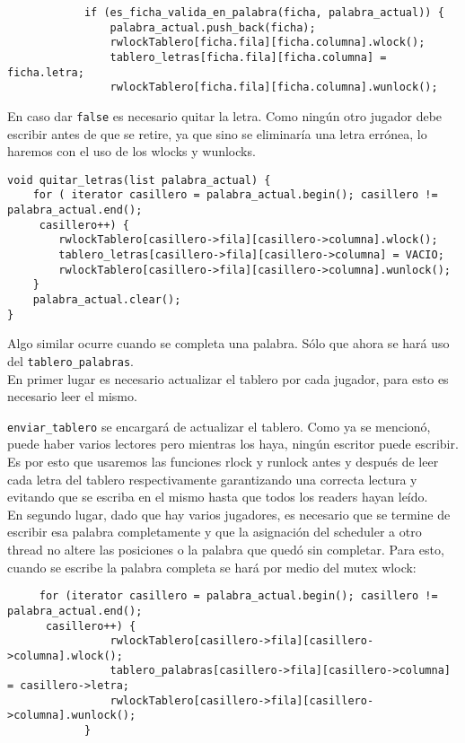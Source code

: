 \begin{verbatim}
            if (es_ficha_valida_en_palabra(ficha, palabra_actual)) {
                palabra_actual.push_back(ficha);
                rwlockTablero[ficha.fila][ficha.columna].wlock();
                tablero_letras[ficha.fila][ficha.columna] = ficha.letra;
                rwlockTablero[ficha.fila][ficha.columna].wunlock(); 
\end{verbatim}

En caso dar \texttt{false} es necesario quitar la letra. Como ningún otro jugador debe escribir antes de que se retire, ya que sino se eliminaría una letra errónea, lo haremos con el uso de los wlocks y wunlocks.

\begin{verbatim}
void quitar_letras(list palabra_actual) {
    for ( iterator casillero = palabra_actual.begin(); casillero != palabra_actual.end();
     casillero++) {
        rwlockTablero[casillero->fila][casillero->columna].wlock();
        tablero_letras[casillero->fila][casillero->columna] = VACIO;
        rwlockTablero[casillero->fila][casillero->columna].wunlock();
    }
    palabra_actual.clear();
}
\end{verbatim}

Algo similar ocurre cuando se completa una palabra. S\'olo que ahora se har\'a uso del \texttt{tablero_palabras}.\\

En primer lugar es necesario actualizar el tablero por cada jugador, para esto es necesario leer el mismo.

\texttt{enviar\_tablero} se encargar\'a de actualizar el tablero. Como ya se mencion\'o, puede haber varios lectores pero mientras los haya, ningún escritor puede escribir. Es por esto que usaremos las funciones rlock y runlock antes y después de leer cada letra del tablero respectivamente garantizando una correcta lectura y evitando que se escriba en el mismo hasta que todos los readers hayan leído.\\

En segundo lugar, dado que hay varios jugadores, es necesario que se termine de escribir esa palabra completamente y que la asignación del scheduler a otro thread no altere las posiciones o la palabra que qued\'o sin completar. Para esto, cuando se escribe la palabra completa se hará por medio del mutex wlock:

\begin{verbatim}
     for (iterator casillero = palabra_actual.begin(); casillero != palabra_actual.end();
      casillero++) {
                rwlockTablero[casillero->fila][casillero->columna].wlock();
                tablero_palabras[casillero->fila][casillero->columna] = casillero->letra;
                rwlockTablero[casillero->fila][casillero->columna].wunlock();
            }
\end{verbatim}
